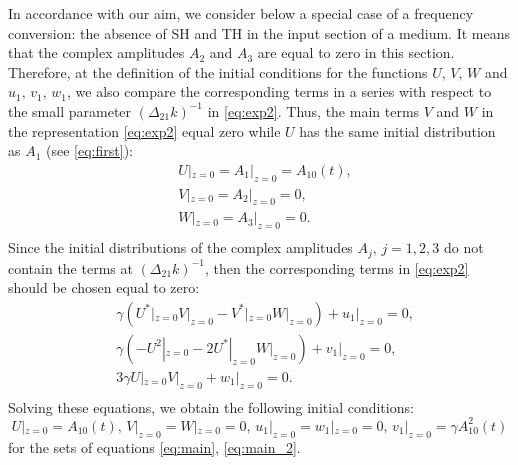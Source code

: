 \documentclass[a4paper, 12pt, onecolumn]{extarticle}
\begin{document}
In accordance with our aim, we consider below a special case of a frequency conversion: the absence of SH and TH in the input section of a medium. It means that the complex amplitudes \(A_2\) and \(A_3\) are equal to zero in this section. Therefore, at the definition of the initial conditions for the functions \(U,\,V,\,W\) and \(u_1,\,v_1,\,w_1\), we also compare the corresponding terms in a series with respect to the small parameter \((\Delta_{21}k)^{-1}\) in \eqref{eq:exp2}. Thus, the main terms \(V\) and \(W\) in the representation \eqref{eq:exp2} equal zero while \(U\) has the same initial distribution as \(A_1\) (see \eqref{eq:first}):
\[
\begin{aligned}
&U|_{z=0}=A_1|_{z=0}=A_{10}(t),\\
&V|_{z=0}=A_2|_{z=0}=0,\\
&W|_{z=0}=A_3|_{z=0}=0.\\
\end{aligned}
\]
Since the initial distributions of the complex amplitudes \(A_j,\,j=1,2,3\) do not contain the terms at \((\Delta_{21}k)^{-1}\), then the corresponding terms in \eqref{eq:exp2} should be chosen equal to zero:
\[
\begin{aligned}
&\gamma\left(U^*|_{z=0}V|_{z=0}-V^*|_{z=0}W|_{z=0}\right)+u_1|_{z=0}=0,\\
&\gamma\left(-U^2|_{z=0}-2U^*|_{z=0}W|_{z=0}\right)+v_1|_{z=0}=0,\\
&3\gamma U|_{z=0}V|_{z=0}+w_1|_{z=0}=0.\\
\end{aligned}
\]
Solving these equations, we obtain the following initial conditions:
\begin{equation}
\label{eq:ini3}
U|_{z=0}=A_{10}(t),\, V|_{z=0}=W|_{z=0}=0,\, u_1|_{z=0}=w_1|_{z=0}=0,\, v_1|_{z=0}=\gamma A_{10}^2(t)
\end{equation}
for the sets of equations \eqref{eq:main}, \eqref{eq:main_2}. 
\end{document}
